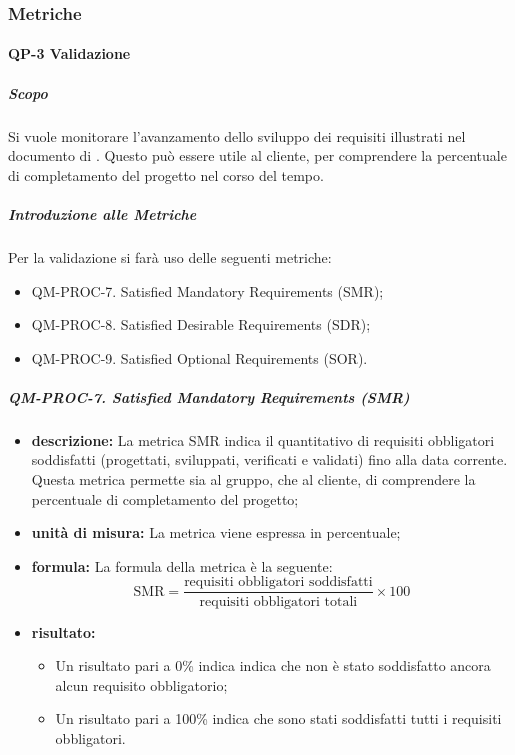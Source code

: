    \subsubsection{Metriche}

    	\paragraph{QP-3 Validazione}

			\subparagraph{Scopo}
				Si vuole monitorare l'avanzamento dello sviluppo dei requisiti illustrati nel documento di . Questo può essere utile al cliente, per comprendere la percentuale di completamento del progetto nel corso del tempo.

			\subparagraph{Introduzione alle Metriche}

			Per la validazione si farà uso delle seguenti metriche:

			\begin{itemize}
				\item QM-PROC-7. Satisfied Mandatory Requirements (SMR);
				\item QM-PROC-8. Satisfied Desirable Requirements (SDR);
				\item QM-PROC-9. Satisfied Optional Requirements (SOR).
			\end{itemize}

			\subparagraph{QM-PROC-7. Satisfied Mandatory Requirements (SMR)}

			\begin{itemize}
			 
				\item \textbf{descrizione: }
				La metrica SMR indica il quantitativo di requisiti obbligatori soddisfatti (progettati, sviluppati, verificati e validati) fino alla data corrente. Questa metrica permette sia al gruppo, che al cliente, di comprendere la percentuale di completamento del progetto;

				\item \textbf{unità di misura: }
				La metrica viene espressa in percentuale;

				\item \textbf{formula: }
				La formula della metrica è la seguente:
				\[
					\text{SMR} = \frac{\text{requisiti obbligatori soddisfatti}}{\text{requisiti obbligatori totali}} \times 100
				\]

				\item \textbf{risultato: }
				\begin{itemize}
					\item Un risultato pari a 0\% indica indica che non è stato soddisfatto ancora alcun requisito obbligatorio;
					\item Un risultato pari a 100\% indica che sono stati soddisfatti tutti i requisiti obbligatori.
				\end{itemize}

			\end{itemize}


